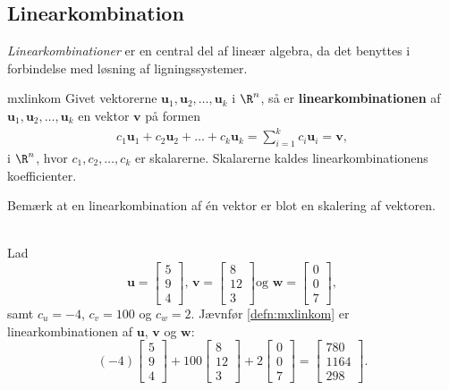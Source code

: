 \subsection{Linearkombination}
\textit{Linearkombinationer} er en central del af lineær algebra, da det benyttes i forbindelse med løsning af ligningssystemer. 
%
\begin{defn}{}{mxlinkom}
Givet vektorerne $\mathbf{u}_1, \mathbf{u}_2, \ldots, \mathbf{u}_k$ i $\R^n$, så er \textbf{linearkombinationen} af $\mathbf{u}_1, \mathbf{u}_2, \ldots, \mathbf{u}_k$ en vektor $\mathbf{v}$ på formen 
%
\begin{align*}
c_1\mathbf{u}_1+c_2\mathbf{u}_2+\ldots+c_k\mathbf{u}_k=\sum\limits_{i=1}^k c_i\mathbf{u}_i=\mathbf{v},
\end{align*}
%
i $\R^n$, hvor $c_1, c_2, \ldots, c_k$ er skalarerne.
Skalarerne kaldes linearkombinationens koefficienter.
%
\end{defn}
%
%
\noindent 
%
Bemærk at en linearkombination af én vektor er blot en skalering af vektoren.
\\\\
%
\begin{eks}
Lad 
$$
\textbf{u}=
\begin{bmatrix}
5 \\
9 \\
4
\end{bmatrix}
\text{, }
\textbf{v}=
\begin{bmatrix}
8  \\
12 \\ 
3
\end{bmatrix}
\text{og }
\textbf{w}=
\begin{bmatrix}
0 \\
0 \\
7
\end{bmatrix},
$$
samt $c_u=-4$, $c_v=100$ og $c_w=2$. 
Jævnfør \ref{defn:mxlinkom} er linearkombinationen af $\textbf{u}$, $\textbf{v}$ og $\textbf{w}$:
$$
(-4)
\begin{bmatrix}
5 \\ 
9 \\ 
4
\end{bmatrix}
+
100
\begin{bmatrix}
8 \\
12 \\ 
3
\end{bmatrix}
+
2
\begin{bmatrix}
0 \\
0 \\ 
7
\end{bmatrix}
=
\begin{bmatrix}
780 \\
1164 \\ 
298
\end{bmatrix}
\text{.}
$$
\end{eks}
